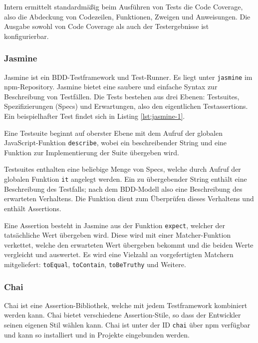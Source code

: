 Intern ermittelt standardmäßig beim Ausführen von Tests die Code Coverage, also die Abdeckung von Codezeilen, Funktionen, Zweigen und Anweisungen. Die Ausgabe sowohl von Code Coverage als auch der Testergebnisse ist konfigurierbar.\cite{intern-userguide}


\subsubsection{Jasmine}
\label{sec:Jasmine}
Jasmine ist ein BDD-Testframework und Test-Runner\cite{jasmine-introduction}. Es liegt unter \texttt{jasmine} im npm-Repository\cite{jasmine-getting-started}. Jasmine bietet eine saubere und einfache Syntax zur Beschreibung von Testfällen. Die Tests bestehen aus drei Ebenen: Testsuites, Spezifizierungen (\glqq Specs\grqq) und Erwartungen, also den eigentlichen Testassertions\cite{jasmine-introduction}. Ein beispielhafter Test findet sich in Listing \ref{lst:jasmine-1}.

Eine Testsuite beginnt auf oberster Ebene mit dem Aufruf der globalen JavaScript-Funktion \texttt{describe}, wobei ein beschreibender String und eine Funktion zur Implementierung der Suite übergeben wird.\cite{jasmine-introduction}

Testsuites enthalten eine beliebige Menge von Specs, welche durch Aufruf der globalen Funktion \texttt{it} angelegt werden. Ein zu übergebender String enthält eine Beschreibung des Testfalls; nach dem BDD-Modell also eine Beschreibung des erwarteten Verhaltens. Die Funktion dient zum Überprüfen dieses Verhaltens und enthält Assertions.\cite{jasmine-introduction}

Eine Assertion besteht in Jasmine aus der Funktion \texttt{expect}, welcher der tatsächliche Wert übergeben wird. Diese wird mit einer Matcher-Funktion verkettet, welche den erwarteten Wert übergeben bekommt und die beiden Werte vergleicht und auswertet. Es wird eine Vielzahl an vorgefertigten Matchern mitgeliefert: \texttt{toEqual}, \texttt{toContain}, \texttt{toBeTruthy} und Weitere\cite{jasmine-introduction, jasmine-cheatsheet}.

\begin{figure}[H]
	
\end{figure}

\subsubsection{Chai}
\label{sec:Chai}
Chai ist eine Assertion-Bibliothek, welche mit jedem Testframework kombiniert werden kann. Chai bietet verschiedene Assertion-Stile, so dass der Entwickler seinen eigenen Stil wählen kann.\cite{chai-index} Chai ist unter der ID \texttt{chai} über npm verfügbar und kann so installiert und in Projekte eingebunden werden\cite{chai-installation}.

